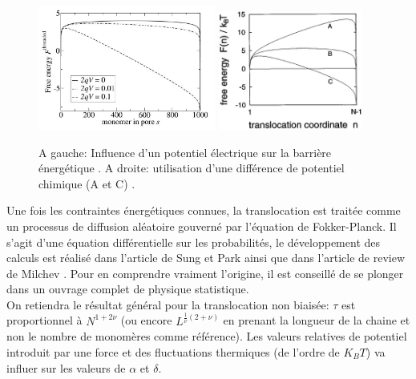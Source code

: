 \documentclass[a4paper,11pt]{article}
\begin{document}
\begin{figure}[H]
\begin{center}
\includegraphics[width=0.52\textwidth]{transelec.jpg} \includegraphics[width=0.42\textwidth]{transpotchim.jpg}

\caption{A gauche: Influence d'un potentiel électrique sur la barrière énergétique \cite{these}.
A droite: utilisation d'une différence de potentiel chimique (A et C) \cite{sung}.}
\label{transpot}
\end{center}
\end{figure}



Une fois les contraintes énergétiques connues, la translocation est traitée comme un processus de diffusion aléatoire gouverné par l'équation de Fokker-Planck. Il s'agit d'une équation différentielle sur les probabilités, le développement des calculs est réalisé dans l'article de Sung et Park \cite{sung} ainsi que dans l'article de review de Milchev \cite{milchev}. Pour en comprendre vraiment l'origine, il est conseillé de se plonger dans un ouvrage complet de physique statistique.\\

On retiendra le résultat général pour la translocation non biaisée: $\tau$ est proportionnel à $N^{1+2\nu}$ (ou encore $L^{\frac{1}{\nu}(2+\nu)}$ en prenant la longueur de la chaine et non le nombre de monomères comme référence). Les valeurs relatives de potentiel introduit par une force et des fluctuations thermiques (de l'ordre de $K_B T$) va influer sur les valeurs de $\alpha$ et $\delta$\cite{sung}\cite{milchev}.\\
\end{document}
